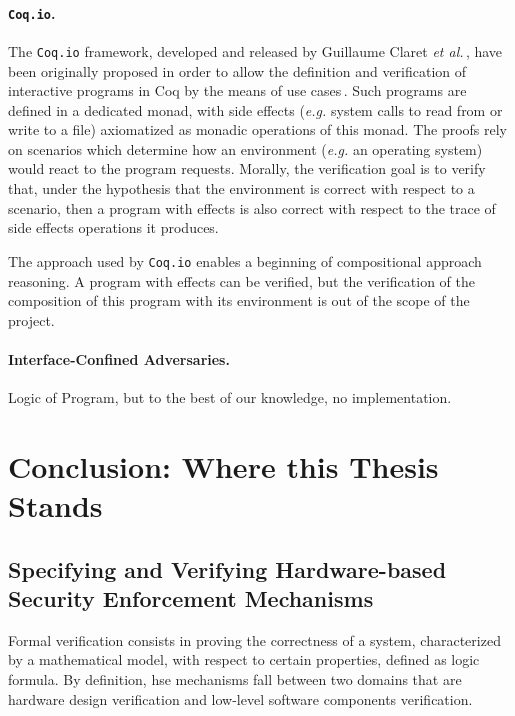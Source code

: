\paragraph{\texttt{Coq.io}.}
%
The \texttt{Coq.io} framework, developed and released by Guillaume Claret
\emph{et al.}\,\cite{claret2015coqiowww}, have been originally proposed in order
to allow the definition and verification of interactive programs in Coq by the
means of use cases\,\cite{claret2015coqio}.
%
Such programs are defined in a dedicated monad, with side effects (\emph{e.g.}
system calls to read from or write to a file) axiomatized as monadic operations
of this monad.
%
The proofs rely on scenarios which determine how an environment (\emph{e.g.} an
operating system) would react to the program requests.
%
Morally, the verification goal is to verify that, under the hypothesis that the
environment is correct with respect to a scenario, then a program with effects
is also correct with respect to the trace of side effects operations it
produces.

The approach used by \texttt{Coq.io} enables a beginning of compositional
approach reasoning.
%
A program with effects can be verified, but the verification of the composition
of this program with its environment is out of the scope of the project.


\paragraph{Interface-Confined Adversaries.}
%
Logic of Program, but to the best of our knowledge, no implementation.
%

\section{Conclusion: Where this Thesis Stands}
\label{sec:sota:conclusion}


\subsection{Specifying and Verifying Hardware-based Security Enforcement
  Mechanisms}

Formal verification consists in proving the correctness of a system,
characterized by a mathematical model, with respect to certain properties,
defined as logic formula.
%
By definition, \ac{hse} mechanisms fall between two domains that are hardware
design verification and low-level software components verification.

